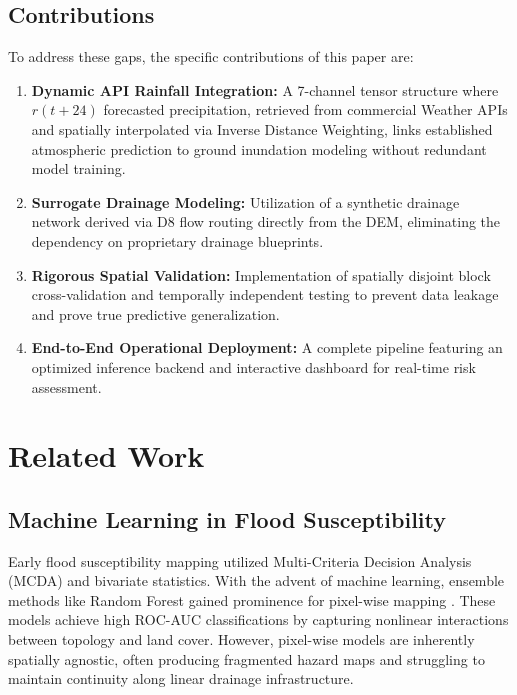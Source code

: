 \documentclass[conference]{IEEEtran}
\begin{document}
\subsection{Contributions}
To address these gaps, the specific contributions of this paper are:
\begin{enumerate}
\item \textbf{Dynamic API Rainfall Integration:} A 7-channel tensor structure where $r(t+24)$ forecasted precipitation, retrieved from commercial Weather APIs and spatially interpolated via Inverse Distance Weighting, links established atmospheric prediction to ground inundation modeling without redundant model training.
\item \textbf{Surrogate Drainage Modeling:} Utilization of a synthetic drainage network derived via D8 flow routing directly from the DEM, eliminating the dependency on proprietary drainage blueprints.
\item \textbf{Rigorous Spatial Validation:} Implementation of spatially disjoint block cross-validation and temporally independent testing to prevent data leakage and prove true predictive generalization.
\item \textbf{End-to-End Operational Deployment:} A complete pipeline featuring an optimized inference backend and interactive dashboard for real-time risk assessment.
\end{enumerate}

\section{Related Work}

\subsection{Machine Learning in Flood Susceptibility}
Early flood susceptibility mapping utilized Multi-Criteria Decision Analysis (MCDA) and bivariate statistics. With the advent of machine learning, ensemble methods like Random Forest gained prominence for pixel-wise mapping \cite{5,6}. These models achieve high ROC-AUC classifications by capturing nonlinear interactions between topology and land cover. However, pixel-wise models are inherently spatially agnostic, often producing fragmented hazard maps and struggling to maintain continuity along linear drainage infrastructure.
\end{document}
